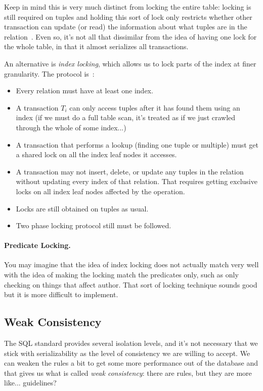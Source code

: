\documentclass[a4paper]{report}
\begin{document}
Keep in mind this is very much distinct from locking the entire table: locking is still required on tuples and holding this sort of lock only restricts whether other transaction can update (or read) the information about what tuples are in the relation~\cite{dsc}. Even so, it's not all that dissimilar from the idea of having one lock for the whole table, in that it almost serializes all transactions.

An alternative is \textit{index locking}, which allows us to lock parts of the index at finer granularity. The protocol is~\cite{dsc}:

\begin{itemize}
	\item Every relation must have at least one index.
	\item A transaction $T_{i}$ can only access tuples after it has found them using an index (if we must do a full table scan, it's treated as if we just crawled through the whole of some index...)
	\item A transaction that performs a lookup (finding one tuple or multiple) must get a shared lock on all the index leaf nodes it accesses.
	\item A transaction may not insert, delete, or update any tuples in the relation without updating every index of that relation. That requires getting exclusive locks on all index leaf nodes affected by the operation. 
	\item Locks are still obtained on tuples as usual.
	\item Two phase locking protocol still must be followed. 
\end{itemize}


\paragraph{Predicate Locking.} You may imagine that the idea of index locking does not actually match very well with the idea of making the locking match the predicates only, such as only checking on things that affect author. That sort of locking technique sounds good but it is more difficult to implement. 

\subsection*{Weak Consistency}

The SQL standard provides several isolation levels, and it's not necessary that we stick with serializability as the level of consistency we are willing to accept. We can weaken the rules a bit to get some more performance out of the database and that gives us what is called \textit{weak consistency}: there are rules, but they are more like... guidelines?
\end{document}

